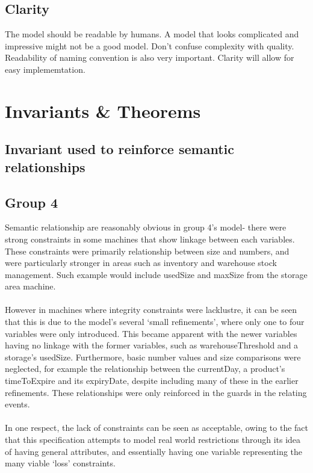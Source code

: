 \subsection{Clarity}
\label{clarity}

The model should be readable by humans. A model that looks complicated and impressive might not be a good model. Don't confuse complexity with quality. Readability of naming convention is also very important. Clarity will allow for easy implememtation.

\section{Invariants \& Theorems}
\label{invariantstheorems}

\subsection{Invariant used to reinforce semantic relationships}
\label{invariantusedtoreinforcesemanticrelationships}

\subsection{Group 4}
\label{group4}

Semantic relationship are reasonably obvious in group 4's model- there were strong constraints in some machines that show linkage between each variables. These constraints were primarily relationship between size and numbers, and were particularly stronger in areas such as inventory and warehouse stock management. Such example would include usedSize and maxSize from the storage area machine.
 \\ \\ However in machines where integrity constraints were lacklustre, it can be seen that this is due to the model’s several ‘small refinements’, where only one to four variables were only introduced. This became apparent with the newer variables having no linkage with the former variables, such as warehouseThreshold and a storage’s usedSize. Furthermore, basic number values and size comparisons were neglected, for example the relationship between the currentDay, a product’s timeToExpire and its expiryDate, despite including many of these in the earlier refinements. These relationships were only reinforced in the guards in the relating events.
 \\ \\ In one respect, the lack of constraints can be seen as acceptable, owing to the fact that this specification attempts to model real world restrictions through its idea of having general attributes, and essentially having one variable representing the many viable ‘loss’ constraints. 

